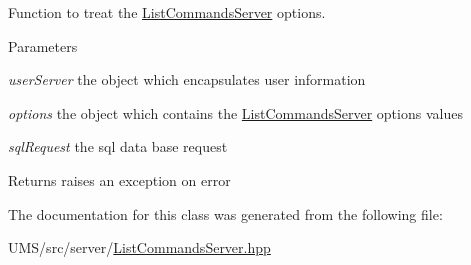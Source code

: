 Function to treat the \hyperlink{classListCommandsServer}{ListCommandsServer} options. 


\begin{DoxyParams}{Parameters}
\item[{\em userServer}]the object which encapsulates user information \item[{\em options}]the object which contains the \hyperlink{classListCommandsServer}{ListCommandsServer} options values \item[{\em sqlRequest}]the sql data base request \end{DoxyParams}
\begin{DoxyReturn}{Returns}
raises an exception on error 
\end{DoxyReturn}


The documentation for this class was generated from the following file:\begin{DoxyCompactItemize}
\item 
UMS/src/server/\hyperlink{ListCommandsServer_8hpp}{ListCommandsServer.hpp}\end{DoxyCompactItemize}
